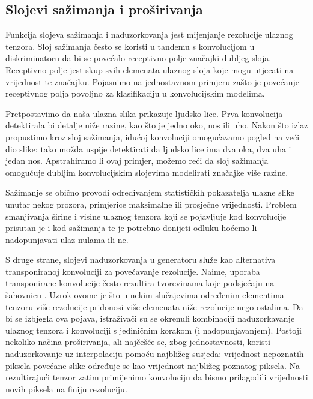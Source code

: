 \subsection{Slojevi sažimanja i proširivanja}
Funkcija slojeva sažimanja i naduzorkovanja jest mijenjanje rezolucije ulaznog tenzora. Sloj sažimanja često se koristi u tandemu s konvolucijom u diskriminatoru da bi se povećalo receptivno polje značajki dubljeg sloja. Receptivno polje jest skup svih elemenata ulaznog sloja koje mogu utjecati na vrijednost te značajku. Pojasnimo na jednostavnom primjeru zašto je povećanje receptivnog polja povoljno za klasifikaciju u konvolucijskim modelima.

Pretpostavimo da naša ulazna slika prikazuje ljudsko lice. Prva konvolucija detektirala bi detalje niže razine, kao što je jedno oko, nos ili uho. Nakon što izlaz propustimo kroz sloj sažimanja, idućoj konvoluciji omogućavamo pogled na veći dio slike: tako možda uspije detektirati da ljudsko lice ima dva oka, dva uha i jedan nos. Apstrahiramo li ovaj primjer, možemo reći da sloj sažimanja omogućuje dubljim konvolucijskim slojevima modelirati značajke više razine.

Sažimanje se obično provodi određivanjem statističkih pokazatelja ulazne slike unutar nekog prozora, primjerice maksimalne ili prosječne vrijednosti. Problem smanjivanja širine i visine ulaznog tenzora koji se pojavljuje kod konvolucije prisutan je i kod sažimanja te je potrebno donijeti odluku hoćemo li nadopunjavati  ulaz nulama ili ne.

S druge strane, slojevi naduzorkovanja u generatoru služe kao alternativa transponiranoj konvoluciji za povećavanje rezolucije. Naime, uporaba transponirane konvolucije često rezultira tvorevinama koje podsjećaju na šahovnicu . Uzrok ovome je što u nekim slučajevima određenim elementima tenzoru više rezolucije pridonosi više elemenata niže rezolucije nego ostalima.  Da bi se izbjegla ova pojava, istraživači su se okrenuli kombinaciji naduzorkavanje ulaznog tenzora i konvoluciji s jediničnim korakom (i nadopunjavanjem). Postoji nekoliko načina proširivanja, ali najčešće se, zbog jednostavnosti, koristi naduzorkovanje uz interpolaciju pomoću najbližeg susjeda: vrijednost nepoznatih piksela povećane slike određuje se kao vrijednost najbližeg poznatog piksela. Na rezultirajući tenzor zatim primijenimo konvoluciju da bismo prilagodili vrijednosti novih piksela na finiju rezoluciju.  